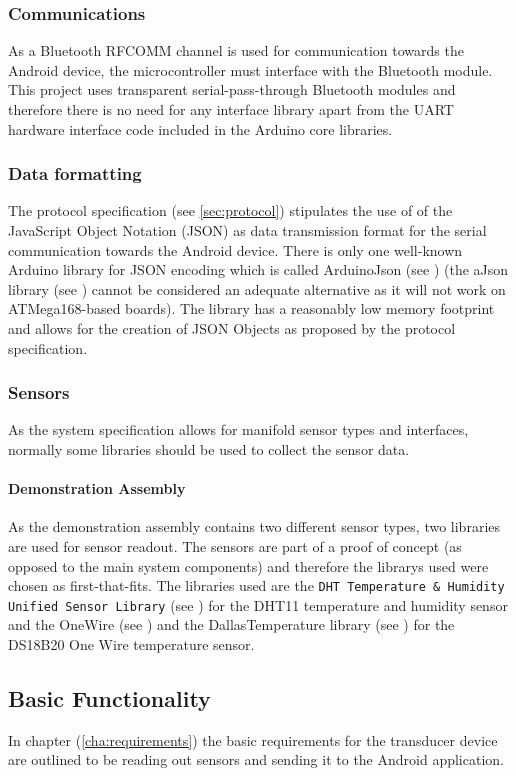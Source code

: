 \subsubsection{Communications}
As a Bluetooth RFCOMM channel is used for communication towards the Android device, the microcontroller must interface with the Bluetooth module. This project uses transparent serial-pass-through Bluetooth modules and therefore there is no need for any interface library apart from the UART hardware interface code included in the Arduino core libraries.

\subsubsection{Data formatting}
The protocol specification (see \ref{sec:protocol}) stipulates the use of of the JavaScript Object Notation (JSON) as data transmission format for the serial communication towards the Android device. There is only one well-known Arduino library for JSON encoding which is called ArduinoJson (see \cite{ArduinoJson}) (the aJson library (see \cite{aJson}) cannot be considered an adequate alternative as it will not work on ATMega168-based boards). The library has a reasonably low memory footprint and allows for the creation of JSON Objects as proposed by the protocol specification.

\subsubsection{Sensors}
As the system specification allows for manifold sensor types and interfaces, normally some libraries should be used to collect the sensor data.

\paragraph{Demonstration Assembly}
\label{p:demonstration_device}
As the demonstration assembly contains two different sensor types, two libraries are used for sensor readout. The sensors are part of a proof of concept (as opposed to the main system components) and therefore the librarys used were chosen as first-that-fits. The libraries used are the \texttt{DHT Temperature \& Humidity Unified Sensor Library} (see \cite{DHTlib}) for the DHT11 temperature and humidity sensor and the OneWire (see \cite{OW}) and the DallasTemperature library (see \cite{DallasTemp}) for the DS18B20 One Wire temperature sensor.

\subsection{Basic Functionality}
In chapter (\ref{cha:requirements}) the basic requirements for the transducer device are outlined to be reading out sensors and sending it to the Android application.

